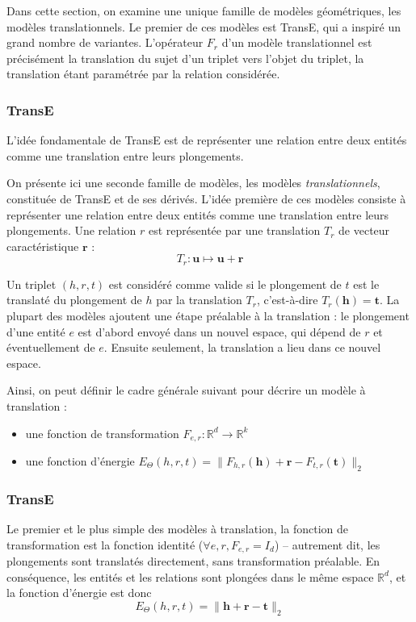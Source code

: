 Dans cette section, on examine une unique famille de modèles géométriques, les modèles translationnels. Le premier de ces modèles est TransE, qui a inspiré un grand nombre de variantes. L'opérateur $F_r$ d'un modèle translationnel est précisément la translation du sujet d'un triplet vers l'objet du triplet, la translation étant paramétrée par la relation considérée.

\subsubsection{TransE}

L'idée fondamentale de TransE est de représenter une relation entre deux entités comme une translation entre leurs plongements. 

On présente ici une seconde famille de modèles, les modèles \textit{translationnels}, constituée de TransE et de ses dérivés. L'idée première de ces modèles consiste à représenter une relation entre deux entités comme une translation entre leurs plongements. Une relation $r$ est représentée par une translation $T_r$ de vecteur caractéristique $\mathbf{r}$ :
\begin{equation*}
    T_r : \mathbf{u} \mapsto \mathbf{u + r}
\end{equation*}

Un triplet $(h, r, t)$ est considéré comme valide si le plongement de $t$ est le translaté du plongement de $h$ par la translation $T_r$, c'est-à-dire $T_r(\mathbf{h}) = \mathbf{t}$. La plupart des modèles ajoutent une étape préalable à la translation : le plongement d'une entité $e$ est d'abord envoyé dans un nouvel espace, qui dépend de $r$ et éventuellement de $e$. Ensuite seulement, la translation a lieu dans ce nouvel espace.

Ainsi, on peut définir le cadre générale suivant pour décrire un modèle à translation :
\begin{itemize}
    \item une fonction de transformation $F_{e, r} : \mathbb{R}^d \rightarrow \mathbb{R}^{k}$
    \item une fonction d'énergie $E_\Theta(h, r, t) = \| F_{h, r}(\mathbf{h}) + \mathbf{r} - F_{t, r}(\mathbf{t}) \|_2 $
\end{itemize}

\subsubsection{TransE \cite{bordes2013translating}}
Le premier et le plus simple des modèles à translation, la fonction de transformation est la fonction identité ($\forall e, r, F_{e, r} = I_d$) – autrement dit, les plongements sont translatés directement, sans transformation préalable. En conséquence, les entités et les relations sont plongées dans le même espace $\mathbb{R}^d$, et la fonction d'énergie est donc
\begin{equation}
    E_\Theta(h, r, t) = \| \mathbf{h + r - t} \|_2
    \label{eq:transe-main}
\end{equation}

